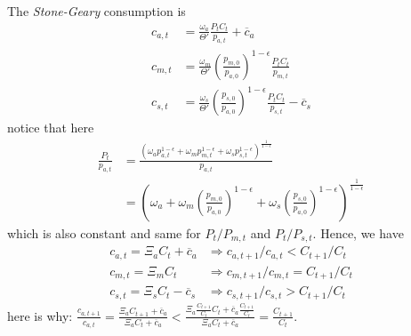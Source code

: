 \documentclass[10pt,landscape,a4paper]{article}
\let\bar\overline
\begin{document}
\begin{multicols*}{3}
\begin{itemize}
The \textit{Stone-Geary} consumption is
\begin{align*}
   c_{a,t} &=\frac{\omega_a}{\Theta'}\frac{P_tC_t}{p_{a,t}}+\bar{c}_a\\
    c_{m,t} &=\frac{\omega_m}{\Theta'} \left(\frac{p_{m,0}}{p_{a,0}}\right)^{1-\epsilon}\frac{P_tC_t}{p_{m,t}}\\
    c_{s,t}&=\frac{\omega_s}{\Theta'} \left(\frac{p_{s,0}}{p_{a,0}}\right)^{1-\epsilon}\frac{P_tC_t}{p_{s,t}}-\bar{c}_s
\end{align*}
notice that here
\begin{align*}
    \frac{P_t}{p_{a,t}} &= \frac{\left(\omega_a p_{a,t}^{1-\epsilon}+\omega_m p_{m,t}^{1-\epsilon}+\omega_s p_{s,t}^{1-\epsilon}\right)^{\frac{1}{1-\epsilon}}}{p_{a,t}}\\
    & =  \left( \omega_a+\omega_m \left(\frac{p_{m,0}}{p_{a,0}}\right)^{1-\epsilon} +\omega_s \left(\frac{p_{s,0}}{p_{a,0}}\right)^{1-\epsilon} \right)^{\frac{1}{1-\epsilon}}
\end{align*}
which is also constant and same for $P_t/P_{m,t}$ and $P_t/P_{s,t}$. Hence, we have 
\begin{align*}
   c_{a,t} = \Xi_a C_t+\bar{c}_a &\Rightarrow c_{a,t+1}/c_{a,t} < C_{t+1}/C_t\\
    c_{m,t} = \Xi_m C_t &\Rightarrow c_{m,t+1}/c_{m,t} = C_{t+1}/C_t\\
    c_{s,t}=\Xi_s C_t -\bar{c}_s &\Rightarrow c_{s,t+1}/c_{s,t} > C_{t+1}/C_t
\end{align*}
here is why: $\frac{c_{a,t+1}}{c_{a,t}}=\frac{\Xi_aC_{t+1}+\bar{c}_a}{\Xi_aC_t+\bar{c}_a}<\frac{\Xi_a\frac{C_{t+1}}{C_t}C_t+\bar{c}_a\frac{C_{t+1}}{C_t}}{\Xi_aC_t+\bar{c}_a}=\frac{C_{t+1}}{C_t}$.


    

\end{itemize}
\end{multicols*}
\end{document}
